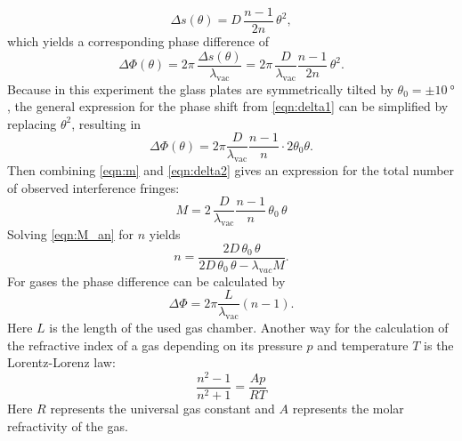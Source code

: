 $$
\Delta s(\theta) = D\,\frac{n-1}{2n}\,\theta^2,
$$
which yields a corresponding phase difference of
\begin{equation}
    \Delta\Phi(\theta) = 2\pi\,\frac{\Delta s(\theta)}{\lambda_\text{vac}} 
                      = 2\pi\,\frac{D}{\lambda_\text{vac}}\frac{n-1}{2n}\,\theta^2.
    \label{eqn:delta1}
\end{equation}
Because in this experiment the glass plates are symmetrically tilted by $\theta_0=\pm\SI{10}{\degree}$, 
the general expression for the phase shift from \autoref{eqn:delta1} can be simplified by replacing $\theta^2$, resulting in
\begin{equation}
    \Delta\Phi(\theta) = 2\pi\frac{D}{\lambda_\text{vac}}\frac{n-1}{n}\cdot 2\theta_0\theta.
\label{eqn:delta2}
\end{equation}
Then combining \autoref{eqn:m} and \autoref{eqn:delta2} gives an expression for the total number of observed interference fringes:
\begin{equation}
    M = 2\,\frac{D}{\lambda_\text{vac}}\frac{n-1}{n}\,\theta_0\,{\theta}
    \label{eqn:M_an}
\end{equation}
\noindent
Solving \autoref{eqn:M_an} for $n$ yields
\begin{equation}
    n =
        \frac{
            2 D\, {\theta_0}\, {\theta}}
             {2 D\, {\theta_0}\, {\theta} - {\lambda_{\mathrm vac}} M}.
       \label{eqn:n_glass}
\end{equation}
For gases the phase difference can be calculated by
\begin{equation*}
    \Delta\Phi=2\pi\frac{L}{\lambda_\text{vac}}(n-1).
\end{equation*}
Here $L$ is the length of the used gas chamber. Another way for the calculation of the refractive index of a gas depending on its pressure $p$ and temperature $T$ is the Lorentz-Lorenz law:
\begin{equation}
    \frac{n^2-1}{n^2+1}=\frac{Ap}{RT}
    \label{eqn:lll}
\end{equation}
Here $R$ represents the universal gas constant and $A$ represents the molar refractivity of the gas.